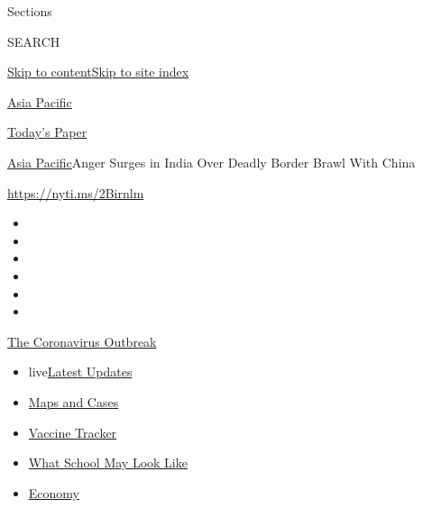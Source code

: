 Sections

SEARCH

\protect\hyperlink{site-content}{Skip to
content}\protect\hyperlink{site-index}{Skip to site index}

\href{https://www.nytimes.com/section/world/asia}{Asia Pacific}

\href{https://myaccount.nytimes.com/auth/login?response_type=cookie\&client_id=vi}{}

\href{https://www.nytimes.com/section/todayspaper}{Today's Paper}

\href{/section/world/asia}{Asia Pacific}\textbar{}Anger Surges in India
Over Deadly Border Brawl With China

\url{https://nyti.ms/2Birnlm}

\begin{itemize}
\item
\item
\item
\item
\item
\item
\end{itemize}

\href{https://www.nytimes.com/news-event/coronavirus?action=click\&pgtype=Article\&state=default\&region=TOP_BANNER\&context=storylines_menu}{The
Coronavirus Outbreak}

\begin{itemize}
\tightlist
\item
  live\href{https://www.nytimes.com/2020/08/02/world/coronavirus-updates.html?action=click\&pgtype=Article\&state=default\&region=TOP_BANNER\&context=storylines_menu}{Latest
  Updates}
\item
  \href{https://www.nytimes.com/interactive/2020/us/coronavirus-us-cases.html?action=click\&pgtype=Article\&state=default\&region=TOP_BANNER\&context=storylines_menu}{Maps
  and Cases}
\item
  \href{https://www.nytimes.com/interactive/2020/science/coronavirus-vaccine-tracker.html?action=click\&pgtype=Article\&state=default\&region=TOP_BANNER\&context=storylines_menu}{Vaccine
  Tracker}
\item
  \href{https://www.nytimes.com/interactive/2020/07/29/us/schools-reopening-coronavirus.html?action=click\&pgtype=Article\&state=default\&region=TOP_BANNER\&context=storylines_menu}{What
  School May Look Like}
\item
  \href{https://www.nytimes.com/live/2020/07/31/business/stock-market-today-coronavirus?action=click\&pgtype=Article\&state=default\&region=TOP_BANNER\&context=storylines_menu}{Economy}
\end{itemize}

